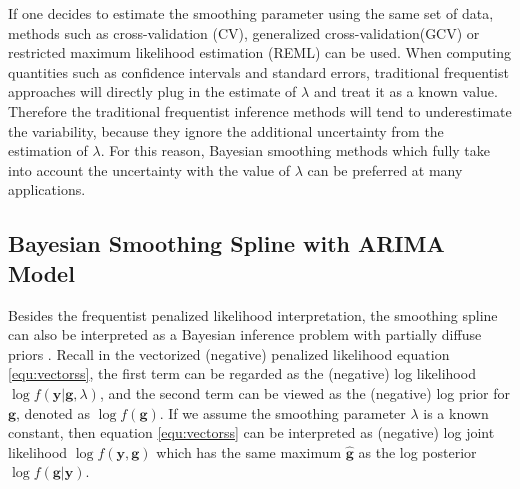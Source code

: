 \documentclass{article}
\begin{document}
If one decides to estimate the smoothing parameter using the same set of data, methods such as cross-validation (CV), generalized cross-validation(GCV) or restricted maximum likelihood estimation (REML) can be used. When computing quantities such as confidence intervals and standard errors, traditional frequentist approaches will directly plug in the estimate of $\lambda$ and treat it as a known value. Therefore the traditional frequentist inference methods will tend to underestimate the variability, because they ignore the additional uncertainty from the estimation of $\lambda$. For this reason, Bayesian smoothing methods which fully take into account the uncertainty with the value of $\lambda$ can be preferred at many applications.










\subsection{Bayesian Smoothing Spline with ARIMA Model}

Besides the frequentist penalized likelihood interpretation, the smoothing spline can also be interpreted as a Bayesian inference problem with partially diffuse priors \citep{ARIMA}. Recall in the vectorized (negative) penalized likelihood equation \ref{equ:vectorss}, the first term can be regarded as the (negative) log likelihood $\log f(\boldsymbol{y}|\boldsymbol{g},\lambda)$, and the second term can be viewed as the (negative) log prior for $\boldsymbol{g}$, denoted as $\log f(\boldsymbol{g})$. If we assume the smoothing parameter $\lambda$ is a known constant, then equation \ref{equ:vectorss} can be interpreted as (negative) log joint likelihood $\log f(\boldsymbol{y},\boldsymbol{g})$ which has the same maximum $\hat{\boldsymbol{g}}$ as the log posterior $\log f(\boldsymbol{g}|\boldsymbol{y})$.
\end{document}
